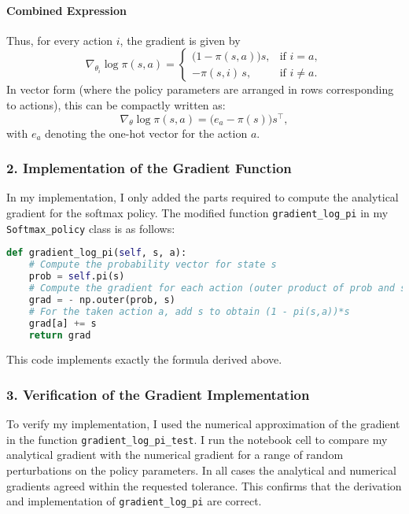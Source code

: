 \paragraph{Combined Expression}  
Thus, for every action $i$, the gradient is given by
\[
\nabla_{\theta_i} \log \pi(s,a) =
\begin{cases}
\bigl(1-\pi(s,a)\bigr) s, & \text{if } i=a,\\[1mm]
-\pi(s,i)\, s, & \text{if } i\neq a.
\end{cases}
\]
In vector form (where the policy parameters are arranged in rows corresponding to actions), this can be compactly written as:
\[
\nabla_{\theta} \log \pi(s,a) = \bigl(e_a - \pi(s)\bigr) s^\top,
\]
with $e_a$ denoting the one-hot vector for the action $a$.

\subsubsection*{2. Implementation of the Gradient Function}

In my implementation, I only added the parts required to compute the analytical gradient for the softmax policy. The modified function \texttt{gradient\_log\_pi} in my \texttt{Softmax\_policy} class is as follows:

\begin{lstlisting}[language=Python, caption=Modified gradient\_log\_pi function]
def gradient_log_pi(self, s, a):
    # Compute the probability vector for state s
    prob = self.pi(s)
    # Compute the gradient for each action (outer product of prob and s)
    grad = - np.outer(prob, s)
    # For the taken action a, add s to obtain (1 - pi(s,a))*s
    grad[a] += s
    return grad
\end{lstlisting}

This code implements exactly the formula derived above.

\subsubsection*{3. Verification of the Gradient Implementation}

To verify my implementation, I used the numerical approximation of the gradient in the function \texttt{gradient\_log\_pi\_test}. I run the notebook cell to compare my analytical gradient with the numerical gradient for a range of random perturbations on the policy parameters. In all cases the analytical and numerical gradients agreed within the requested tolerance. This confirms that the derivation and implementation of \texttt{gradient\_log\_pi} are correct.